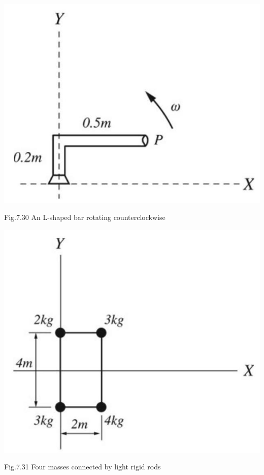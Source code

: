 \documentclass[10pt]{article}
\begin{document}
\begin{center}
\includegraphics[max width=\textwidth]{2024_09_13_db1f357d2aad0a03eb2eg-129(2)}
\end{center}

Fig.7.30 An L-shaped bar rotating counterclockwise

\begin{center}
\includegraphics[max width=\textwidth]{2024_09_13_db1f357d2aad0a03eb2eg-129(3)}
\end{center}

Fig.7.31 Four masses connected by light rigid rods
\end{document}
